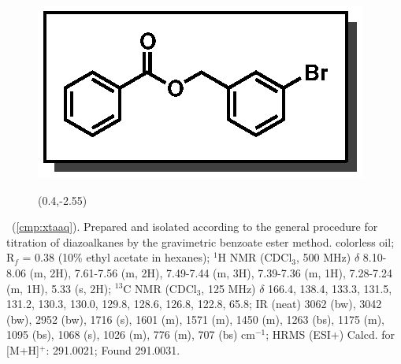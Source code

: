\vspace{10pt}
\begin{figure}
  \vspace{-30pt}
  \begin{center}
    \includegraphics[scale=0.8]{chp_asymmetric/images/xtaaq}
           \begin{textblock}{1}(0.4,-2.55)  \end{textblock}
  \end{center}
  \vspace{-40pt}
\end{figure}\noindent \textbf{\CMPxtaaq}\ (\ref{cmp:xtaaq}). Prepared and
isolated according to the general procedure for titration of diazoalkanes by the
gravimetric benzoate ester method. colorless oil; R$_f$ = 0.38 (10\% ethyl
acetate in hexanes); $^1$H NMR (CDCl$_3$, 500 MHz) $\delta$ 8.10-8.06 (m, 2H),
7.61-7.56 (m, 2H), 7.49-7.44 (m, 3H), 7.39-7.36 (m, 1H), 7.28-7.24 (m, 1H), 5.33
(s, 2H); $^{13}$C NMR (CDCl$_3$, 125 MHz) $\delta$ 166.4, 138.4, 133.3, 131.5,
131.2, 130.3, 130.0, 129.8, 128.6, 126.8, 122.8, 65.8; IR (neat) 3062 (bw), 3042
(bw), 2952 (bw), 1716 (s), 1601 (m), 1571 (m), 1450 (m), 1263 (bs), 1175 (m),
1095 (bs), 1068 (s), 1026 (m), 776 (m), 707 (bs) cm$^{-1}$; HRMS (ESI+) Calcd.
for  [M+H]$^+$: 291.0021; Found 291.0031.


